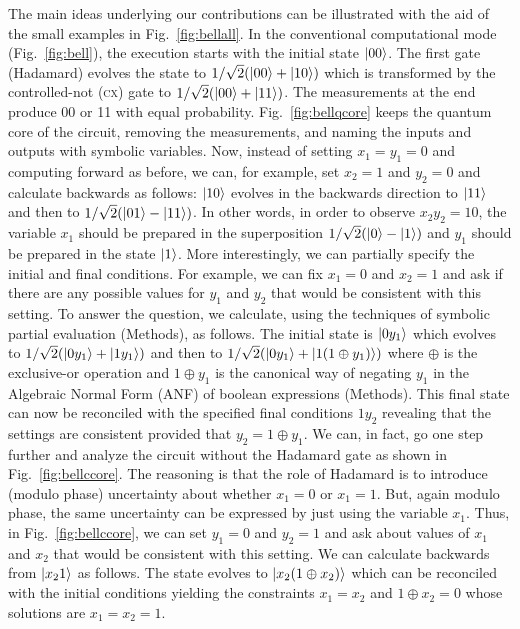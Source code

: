 \documentclass[sigplan]{acmart}
\newcommand{\cx}{\textsc{cx}}
\begin{document}
The main ideas underlying our contributions can be illustrated with
the aid of the small examples in Fig.~\ref{fig:bellall}. In the
conventional computational mode (Fig.~\ref{fig:bell}), the execution
starts with the initial state $\ket{00}$. The first gate (Hadamard)
evolves the state to $1/\sqrt{2}(\ket{00} + \ket{10})$ which is
transformed by the controlled-not (\cx) gate to $1/\sqrt{2}(\ket{00} +
\ket{11})$. The measurements at the end produce 00 or 11 with equal
probability. Fig.~\ref{fig:bellqcore} keeps the quantum core of the
circuit, removing the measurements, and naming the inputs and outputs
with symbolic variables. Now, instead of setting $x_1=y_1=0$ and
computing forward as before, we can, for example, set $x_2=1$ and
$y_2=0$ and calculate backwards as follows: $\ket{10}$ evolves in the
backwards direction to $\ket{11}$ and then to
$1/\sqrt{2}(\ket{01}-\ket{11})$. In other words, in order to observe
$x_2y_2=10$, the variable $x_1$ should be prepared in the
superposition $1/\sqrt{2}(\ket{0}-\ket{1})$ and $y_1$ should be
prepared in the state $\ket{1}$. More interestingly, we can partially
specify the initial and final conditions. For example, we can fix
$x_1=0$ and $x_2=1$ and ask if there are any possible values for $y_1$
and $y_2$ that would be consistent with this setting. To answer the
question, we calculate, using the techniques of symbolic partial
evaluation (Methods), as follows. The initial state is $\ket{0y_1}$
which evolves to $1/\sqrt{2}(\ket{0y_1}+\ket{1y_1})$ and then to
$1/\sqrt{2}(\ket{0y_1}+\ket{1(1 \oplus y_1)})$ where $\oplus$ is the
exclusive-or operation and $1 \oplus y_1$ is the canonical way of
negating $y_1$ in the Algebraic Normal Form (ANF) of boolean
expressions (Methods). This final state can now be reconciled with the
specified final conditions $1y_2$ revealing that the settings are
consistent provided that $y_2 = 1 \oplus y_1$. We can, in fact, go one
step further and analyze the circuit without the Hadamard gate as
shown in Fig.~\ref{fig:bellccore}. The reasoning is that the role of
Hadamard is to introduce (modulo phase) uncertainty about whether
$x_1=0$ or $x_1=1$. But, again modulo phase, the same uncertainty can
be expressed by just using the variable $x_1$. Thus, in
Fig.~\ref{fig:bellccore}, we can set $y_1=0$ and $y_2=1$ and ask about
values of $x_1$ and $x_2$ that would be consistent with this
setting. We can calculate backwards from $\ket{x_21}$ as follows. The
state evolves to $\ket{x_2(1 \oplus x_2)}$ which can be reconciled
with the initial conditions yielding the constraints $x_1=x_2$ and $1
\oplus x_2 = 0$ whose solutions are $x_1 = x_2 = 1$.
\end{document}
